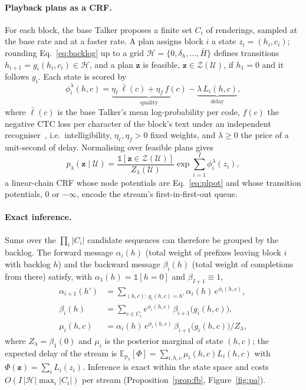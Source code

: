 \paragraph{Playback plans as a CRF.} For each block, the base Talker proposes a finite set $C_i$ of renderings, sampled at
the base rate and at a faster rate. A plan assigns block $i$ a state $z_i=(h_i,c_i)$; rounding Eq.~\eqref{eq:backlog} up
to a grid $\mathcal{H}=\{0,\delta_h,\dots,\bar H\}$ defines transitions $h_{i+1}=g_i(h_i,c_i)\in\mathcal{H}$, and a plan
$\bm{z}$ is feasible, $\bm{z}\in\mathcal{Z}(\mathcal{U})$, if $h_1=0$ and it follows $g_i$. Each state is scored by
\begin{equation}
\phi^\lambda_i(h,c)=\underbrace{\eta_\ell\,\bar\ell(c)+\eta_f\,f(c)}_{\text{quality}}-\underbrace{\lambda\,L_i(h,c)}_{\text{delay}},
\label{eq:plpot}
\end{equation}
where $\bar\ell(c)$ is the base Talker's mean log-probability per code, $f(c)$ the negative CTC loss per character of
the block's text under an independent recogniser~\citep{baevski2020wav2vec}, i.e.\ intelligibility, $\eta_\ell,\eta_f>0$
fixed weights, and $\lambda\ge0$ the price of a unit-second of delay. Normalising over feasible plans gives
\begin{equation}
p_\lambda(\bm{z}\mid\mathcal{U})=\frac{\mathds{1}[\bm{z}\in\mathcal{Z}(\mathcal{U})]}{Z_\lambda(\mathcal{U})}\exp\sum_{i=1}^{I}\phi^\lambda_i(z_i),
\label{eq:crf}
\end{equation}
a linear-chain CRF whose node potentials are Eq.~\eqref{eq:plpot} and whose transition potentials, $0$ or $-\infty$, encode
the stream's first-in-first-out queue.

\paragraph{Exact inference.} Sums over the $\prod_i|C_i|$ candidate sequences can therefore be grouped by the
backlog. The forward message $\alpha_i(h)$ (total weight of prefixes
leaving block $i$ with backlog $h$) and the backward message $\beta_i(h)$ (total weight of completions from there)
satisfy, with $\alpha_1(h)=\mathds{1}[h=0]$ and $\beta_{I+1}\equiv1$,
\begin{equation}
\begin{aligned}
\alpha_{i+1}(h')&=\textstyle\sum_{(h,c):\,g_i(h,c)=h'}\alpha_i(h)\,e^{\phi_i(h,c)},\\
\beta_i(h)&=\textstyle\sum_{c\in C_i}e^{\phi_i(h,c)}\,\beta_{i+1}\big(g_i(h,c)\big),\\
\mu_i(h,c)&=\alpha_i(h)\,e^{\phi_i(h,c)}\,\beta_{i+1}\big(g_i(h,c)\big)/Z_\lambda,
\end{aligned}
\label{eq:fb}
\end{equation}
where $Z_\lambda=\beta_1(0)$ and $\mu_i$ is the posterior marginal of state $(h,c)$; the expected delay of the stream
is $\mathbb{E}_{p_\lambda}[\Phi]=\sum_{i,h,c}\mu_i(h,c)L_i(h,c)$ with $\Phi(\bm{z})=\sum_iL_i(z_i)$. Inference is exact
within the state space and costs $O(I\,|\mathcal{H}|\max_i|C_i|)$ per stream (Proposition~\ref{prop:fb},
Figure~\ref{fig:pa}).

